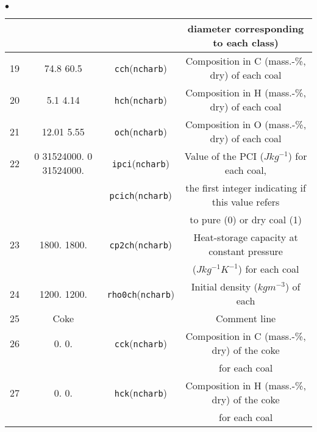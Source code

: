 {{{\begin{list}{$\bullet$}{}
\begin{table}[htbp]
\begin{center}
{\begin{tabular}{|c|c|c|c|}
        &                                &                               & diameter corresponding to each class)                \\ \hline
  19    &    74.8          60.5          & \texttt{cch\index{cch}}(\texttt{ncharb})& Composition in C (mass.-\%, dry) of each coal        \\ \hline
  20    &     5.1           4.14         & \texttt{hch\index{hch}}(\texttt{ncharb})& Composition in H (mass.-\%, dry) of each coal        \\ \hline
  21    &    12.01          5.55         & \texttt{och\index{och}}(\texttt{ncharb})& Composition in O (mass.-\%, dry) of each coal        \\ \hline
  22    & 0  31524000.    0  31524000.   & \texttt{ipci\index{ipci}}(\texttt{ncharb})      & Value of the PCI ($Jkg^{-1}$) for each coal,         \\
        &                                & \texttt{pcich\index{pcich}}(\texttt{ncharb})    & the first integer indicating if this value refers    \\
        &                                &                               & to pure (0) or dry coal (1)                          \\ \hline
  23    &   1800.      1800.             & \texttt{cp2ch\index{cp2ch}}(\texttt{ncharb})& Heat-storage capacity at constant pressure        \\
        &                                &                               & ($Jkg^{-1}K^{-1}$) for each coal                     \\ \hline
  24    &   1200.      1200.             & \texttt{rho0ch\index{rho0ch}}(\texttt{ncharb})   & Initial density ($kgm^{-3}$) of each                 \\ \hline
  25    &          Coke                  &                               & Comment line                                         \\ \hline
  26    &      0.         0.             & \texttt{cck\index{cck}}(\texttt{ncharb}) & Composition in C (mass.-\%, dry) of the coke         \\
        &                                &                               & for each coal                                        \\ \hline
  27    &      0.         0.             & \texttt{hck\index{hck}}(\texttt{ncharb}) & Composition in H (mass.-\%, dry) of the coke         \\
        &                                &                               & for each coal                                        \\ \hline

\end{tabular}}
\end{center}
\end{table}
\end{list}}}}

